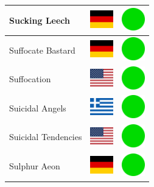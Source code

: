 \documentclass[12pt, a4paper, twoside]{report}
\begin{document}
\begin{center}
\begin{longtable}{|p{5cm}|p{2cm}|p{2cm}|}
 Sucking Leech                                              & \includegraphics[width=1cm]{../4x3/de} &   \includegraphics[width=1cm]{../likes/y} \\ \hline
 Suffocate Bastard                                          & \includegraphics[width=1cm]{../4x3/de} &   \includegraphics[width=1cm]{../likes/y} \\ \hline
 Suffocation                                                & \includegraphics[width=1cm]{../4x3/us} &   \includegraphics[width=1cm]{../likes/y} \\ \hline
 Suicidal Angels                                            & \includegraphics[width=1cm]{../4x3/gr} &   \includegraphics[width=1cm]{../likes/y} \\ \hline
 Suicidal Tendencies                                        & \includegraphics[width=1cm]{../4x3/us} &   \includegraphics[width=1cm]{../likes/y} \\ \hline
 Sulphur Aeon                                               & \includegraphics[width=1cm]{../4x3/de} &   \includegraphics[width=1cm]{../likes/y} \\ \hline

\end{longtable}
\end{center}
\end{document}
